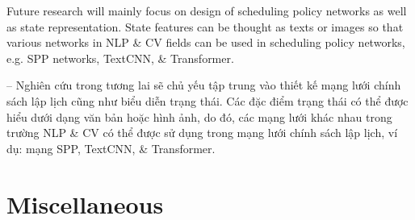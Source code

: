 \documentclass{article}
\begin{document}
\begin{itemize}
    Future research will mainly focus on design of scheduling policy networks as well as state representation. State features can be thought as texts or images so that various networks in NLP \& CV fields can be used in scheduling policy networks, e.g. SPP networks, TextCNN, \& Transformer.

    -- Nghiên cứu trong tương lai sẽ chủ yếu tập trung vào thiết kế mạng lưới chính sách lập lịch cũng như biểu diễn trạng thái. Các đặc điểm trạng thái có thể được hiểu dưới dạng văn bản hoặc hình ảnh, do đó, các mạng lưới khác nhau trong trường NLP \& CV có thể được sử dụng trong mạng lưới chính sách lập lịch, ví dụ: mạng SPP, TextCNN, \& Transformer.
\end{itemize}



\section{Miscellaneous}


\printbibliography[heading=bibintoc]
\end{document}
